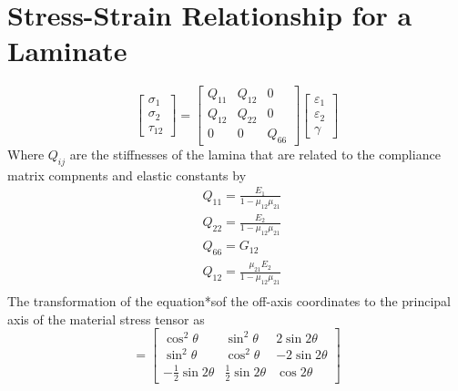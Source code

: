 \documentclass[smallextended]{svjour3}       %
\begin{document}
\section{Stress-Strain Relationship for a Laminate}
\begin{equation}
    \begin{bmatrix}
        \sigma_1\\
        \sigma_2\\
        \tau_{12}
    \end{bmatrix}
    =
    \begin{bmatrix}
        Q_{11} & Q_{12} & 0\\
        Q_{12} & Q_{22} & 0\\
        0 & 0 & Q_{66}
    \end{bmatrix}
    \begin{bmatrix}
        \varepsilon_1\\
        \varepsilon_2\\
        \gamma
    \end{bmatrix}
\end{equation}
Where $Q_{ij}$ are the stiffnesses of the lamina that are related to the compliance matrix
compnents and elastic constants by
\begin{equation}
    \begin{split}
    &Q_{11}=\frac{E_1}{1-\mu_{12}\mu_{21}}\\
    &Q_{22}=\frac{E_2}{1-\mu_{12}\mu_{21}}\\
    &Q_{66}=G_{12}\\
    &Q_{12}=\frac{\mu_{21}E_2}{1-\mu_{12}\mu_{21}}\\
    \end{split}
\end{equation}
The transformation of the equation*sof the off-axis coordinates to the principal axis of the material stress tensor as
\begin{equation}
    [T]=
    \begin{bmatrix}
        \cos^2\theta & \sin^2\theta & 2\sin2\theta \\
        \sin^2\theta & \cos^2\theta & -2\sin2\theta \\
        -\frac{1}{2}\sin2\theta & \frac{1}{2}\sin2\theta & \cos2\theta
    \end{bmatrix}
\end{equation}
\end{document}
